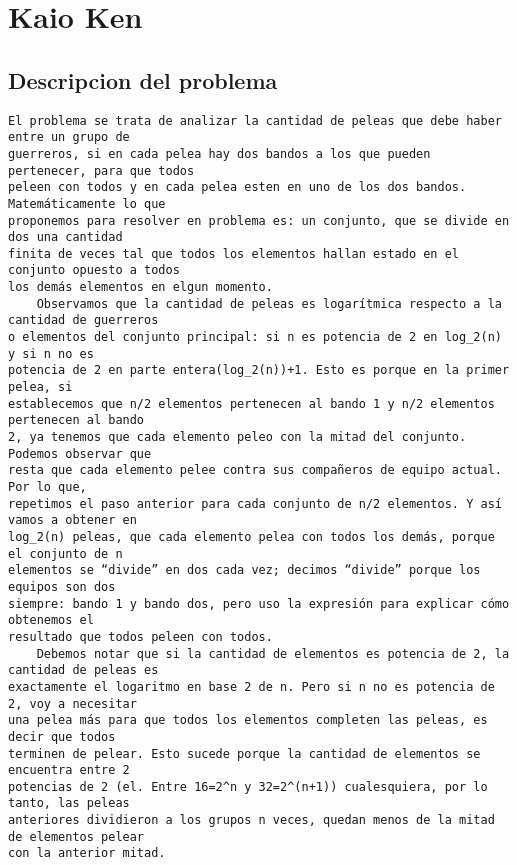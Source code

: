 \documentclass[10pt,a4paper]{article}
\begin{document}

\section{Kaio Ken}

\subsection{Descripcion del problema}
\begin{verbatim}
El problema se trata de analizar la cantidad de peleas que debe haber entre un grupo de
guerreros, si en cada pelea hay dos bandos a los que pueden pertenecer, para que todos
peleen con todos y en cada pelea esten en uno de los dos bandos. Matemáticamente lo que
proponemos para resolver en problema es: un conjunto, que se divide en dos una cantidad
finita de veces tal que todos los elementos hallan estado en el conjunto opuesto a todos
los demás elementos en elgun momento.
	Observamos que la cantidad de peleas es logarítmica respecto a la cantidad de guerreros
o elementos del conjunto principal: si n es potencia de 2 en log_2(n) y si n no es
potencia de 2 en parte entera(log_2(n))+1. Esto es porque en la primer pelea, si
establecemos que n/2 elementos pertenecen al bando 1 y n/2 elementos pertenecen al bando
2, ya tenemos que cada elemento peleo con la mitad del conjunto. Podemos observar que
resta que cada elemento pelee contra sus compañeros de equipo actual. Por lo que,
repetimos el paso anterior para cada conjunto de n/2 elementos. Y así vamos a obtener en
log_2(n) peleas, que cada elemento pelea con todos los demás, porque el conjunto de n
elementos se “divide” en dos cada vez; decimos “divide” porque los equipos son dos
siempre: bando 1 y bando dos, pero uso la expresión para explicar cómo obtenemos el
resultado que todos peleen con todos. 
	Debemos notar que si la cantidad de elementos es potencia de 2, la cantidad de peleas es
exactamente el logaritmo en base 2 de n. Pero si n no es potencia de 2, voy a necesitar
una pelea más para que todos los elementos completen las peleas, es decir que todos
terminen de pelear. Esto sucede porque la cantidad de elementos se encuentra entre 2
potencias de 2 (el. Entre 16=2^n y 32=2^(n+1)) cualesquiera, por lo tanto, las peleas
anteriores dividieron a los grupos n veces, quedan menos de la mitad de elementos pelear
con la anterior mitad.
\end{verbatim}
	 
\end{document}
